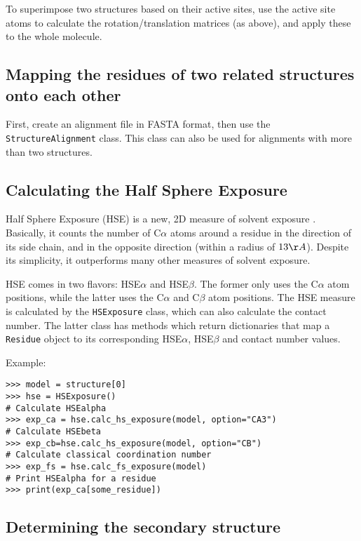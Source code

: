 To superimpose two structures based on their active sites, use the active site atoms to calculate the rotation/translation matrices (as above), and apply these to the whole molecule.

\subsection{Mapping the residues of two related structures onto each other}

First, create an alignment file in FASTA format, then use the \texttt{StructureAlignment}
class. This class can also be used for alignments with more than two
structures.

\subsection{Calculating the Half Sphere Exposure}

Half Sphere Exposure (HSE) is a new, 2D measure of solvent exposure
\cite{hamelryck2005}.
Basically, it counts the number of C$\alpha$ atoms around a residue
in the direction of its side chain, and in the opposite direction
(within a radius of $13 \AA$). Despite its simplicity, it outperforms
many other measures of solvent exposure.

HSE comes in two flavors: HSE$\alpha$ and HSE$\beta$. The former
only uses the C$\alpha$ atom positions, while the latter uses the
C$\alpha$ and C$\beta$ atom positions. The HSE measure is calculated
by the \texttt{HSExposure} class, which can also calculate the contact
number. The latter class has methods which return dictionaries that
map a \texttt{Residue} object to its corresponding HSE$\alpha$, HSE$\beta$
and contact number values.

Example:

\begin{verbatim}
>>> model = structure[0]
>>> hse = HSExposure()
# Calculate HSEalpha
>>> exp_ca = hse.calc_hs_exposure(model, option="CA3")
# Calculate HSEbeta
>>> exp_cb=hse.calc_hs_exposure(model, option="CB")
# Calculate classical coordination number
>>> exp_fs = hse.calc_fs_exposure(model)
# Print HSEalpha for a residue
>>> print(exp_ca[some_residue])
\end{verbatim}

\subsection{Determining the secondary structure}

